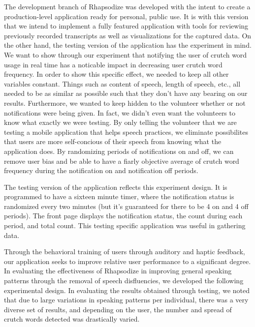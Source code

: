 \documentclass{sigchi}
\begin{document}
The development branch of Rhapsodize was developed with the intent to create a production-level application ready for personal, public use. It is with this version that we intend to implement a fully featured application with tools for reviewing previously recorded transcripts as well as visualizations for the captured data. On the other hand, the testing version of the application has the experiment in mind. We want to show through our experiment that notifying the user of crutch word usage in real time has a noticable impact in decreasing user crutch word frequency. In order to show this specific effect, we needed to keep all other variables constant. Things such as content of speech, length of speech, etc., all needed to be as similar as possible such that they don't have any bearing on our results. Furthermore, we wanted to keep hidden to the volunteer whether or not notifications were being given. In fact, we didn't even want the volunteers to know what exactly we were testing. By only telling the volunteer that we are testing a mobile application that helps speech practices, we eliminate possibilites that users are more self-concious of their speech from knowing what the application does. By randomizing periods of notifications on and off, we can remove user bias and be able to have a fiarly objective average of crutch word frequency during the notification on and notification off periods.

The testing version of the application reflects this experiment design. It is programmed to have a sixteen minute timer, where the notification status is randomized every two minutes (but it's guaranteed for there to be 4 on and 4 off periods). The front page displays the notification status, the count during each period, and total count. This testing specific application was useful in gathering data.

Through the behavioral training of users through auditory and haptic feedback, our application seeks to improve relative user performance to a significant degree. In evaluating the effectiveness of Rhapsodize in improving general speaking patterns through the removal of speech disfluencies, we developed the following experimental design. In evaluating the results obtained through testing, we noted that due to large variations in speaking patterns per individual, there was a very diverse set of results, and depending on the user, the number and spread of crutch words detected was drastically varied.
\end{document}
